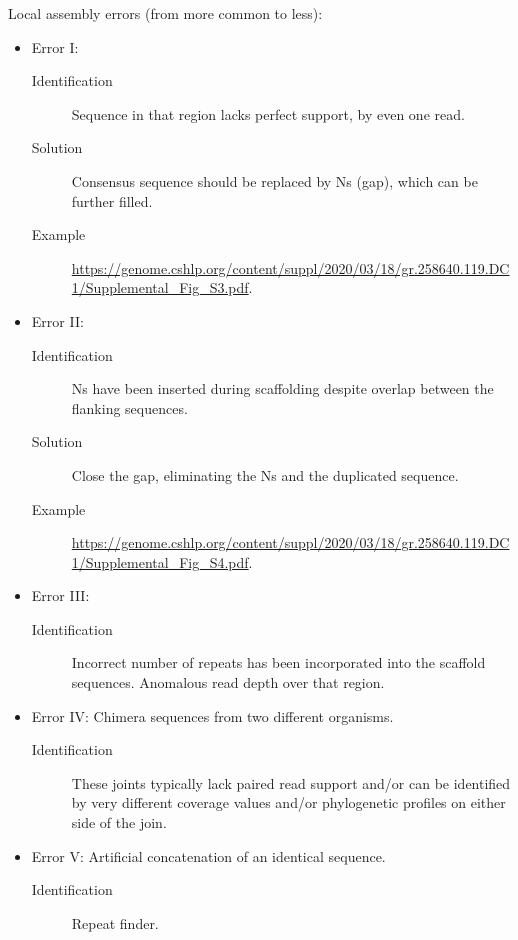 Local assembly errors (from more common to less):
\begin{itemize}
    \item Error I:
    \begin{description}
        \item[Identification] Sequence in that region lacks perfect support, by even one read.
        \item[Solution] Consensus sequence should be replaced by Ns (gap), which can be further filled.
        \item[Example] \url{https://genome.cshlp.org/content/suppl/2020/03/18/gr.258640.119.DC1/Supplemental_Fig_S3.pdf}.
    \end{description}  
    \item Error II:
    \begin{description}
        \item[Identification] Ns have been inserted during scaffolding despite overlap between the flanking sequences.
        \item[Solution] Close the gap, eliminating the Ns and the duplicated sequence.
        \item[Example] \url{https://genome.cshlp.org/content/suppl/2020/03/18/gr.258640.119.DC1/Supplemental_Fig_S4.pdf}.
    \end{description}
    \item Error III:
    \begin{description}
        \item[Identification] Incorrect number of repeats has been incorporated into the scaffold sequences. Anomalous read 
        depth over that region.
    \end{description}
    \item Error IV: Chimera sequences from two different organisms.
    \begin{description}
        \item[Identification] These joints typically lack paired read support and/or can be identified by very different 
        coverage values and/or phylogenetic profiles on either side of the join.
    \end{description}
    \item Error V: Artificial concatenation of an identical sequence.
    \begin{description}
        \item[Identification] Repeat finder.
    \end{description}
\end{itemize}

